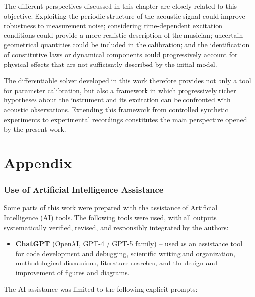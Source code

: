 \documentclass[11pt,a4paper]{report}
\theoremstyle{plain}
\theoremstyle{definition}
\begin{document}
The different perspectives discussed in this chapter are closely related to
this objective. Exploiting the periodic structure of the acoustic signal could
improve robustness to measurement noise; considering time-dependent excitation
conditions could provide a more realistic description of the musician;
uncertain geometrical quantities could be included in the calibration; and the
identification of constitutive laws or dynamical components could progressively
account for physical effects that are not sufficiently described by the
initial model.

The differentiable solver developed in this work therefore provides not only
a tool for parameter calibration, but also a framework in which progressively
richer hypotheses about the instrument and its excitation can be confronted
with acoustic observations. Extending this framework from controlled synthetic
experiments to experimental recordings constitutes the main perspective opened
by the present work.
\newpage
\part*{Appendix}

\section*{Use of Artificial Intelligence Assistance}

Some parts of this work were prepared with the assistance of Artificial Intelligence (AI) tools.  
The following tools were used, with all outputs systematically verified, revised, and responsibly integrated by the authors:

\begin{itemize}
    \item \textbf{ChatGPT} (OpenAI, GPT-4 / GPT-5 family) -- used as an
    assistance tool for code development and debugging, scientific writing
    and organization, methodological discussions, literature searches, and
    the design and improvement of figures and diagrams.
\end{itemize}

The AI assistance was limited to the following explicit prompts:
\end{document}
